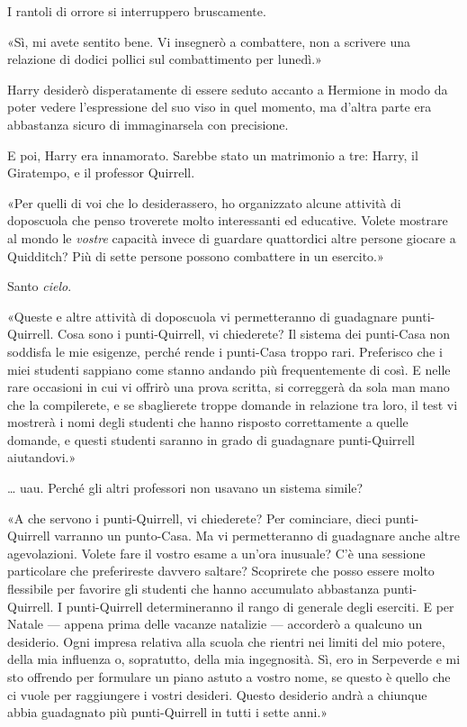 I rantoli di orrore si interruppero bruscamente.

«Sì, mi avete sentito bene. Vi insegnerò a combattere, non a scrivere una relazione di dodici pollici sul combattimento per lunedì.»

Harry desiderò disperatamente di essere seduto accanto a Hermione in modo da poter vedere l’espressione del suo viso in quel momento, ma d’altra parte era abbastanza sicuro di immaginarsela con precisione.

E poi, Harry era innamorato. Sarebbe stato un matrimonio a tre: Harry, il Giratempo, e il professor Quirrell.

«Per quelli di voi che lo desiderassero, ho organizzato alcune attività di doposcuola che penso troverete molto interessanti ed educative. Volete mostrare al mondo le \textit{vostre} capacità invece di guardare quattordici altre persone giocare a Quidditch? Più di sette persone possono combattere in un esercito.»

Santo \textit{cielo}.

«Queste e altre attività di doposcuola vi permetteranno di guadagnare punti-Quirrell. Cosa sono i punti-Quirrell, vi chiederete? Il sistema dei punti-Casa non soddisfa le mie esigenze, perché rende i punti-Casa troppo rari. Preferisco che i miei studenti sappiano come stanno andando più frequentemente di così. E nelle rare occasioni in cui vi offrirò una prova scritta, si correggerà da sola man mano che la compilerete, e se sbaglierete troppe domande in relazione tra loro, il test vi mostrerà i nomi degli studenti che hanno risposto correttamente a quelle domande, e questi studenti saranno in grado di guadagnare punti-Quirrell aiutandovi.»

… uau. Perché gli altri professori non usavano un sistema simile?

«A che servono i punti-Quirrell, vi chiederete? Per cominciare, dieci punti-Quirrell varranno un punto-Casa. Ma vi permetteranno di guadagnare anche altre agevolazioni. Volete fare il vostro esame a un’ora inusuale? C’è una sessione particolare che preferireste davvero saltare? Scoprirete che posso essere molto flessibile per favorire gli studenti che hanno accumulato abbastanza punti-Quirrell. I punti-Quirrell determineranno il rango di generale degli eserciti. E per Natale — appena prima delle vacanze natalizie — accorderò a qualcuno un desiderio. Ogni impresa relativa alla scuola che rientri nei limiti del mio potere, della mia influenza o, sopratutto, della mia ingegnosità. Sì, ero in Serpeverde e mi sto offrendo per formulare un piano astuto a vostro nome, se questo è quello che ci vuole per raggiungere i vostri desideri. Questo desiderio andrà a chiunque abbia guadagnato più punti-Quirrell in tutti i sette anni.»

